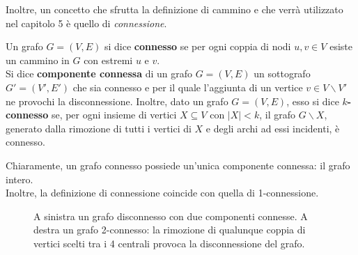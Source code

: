 \documentclass[a4paper,12pt,titlepage]{report}
\begin{document}
	Inoltre, un concetto che sfrutta la definizione di cammino e che verrà utilizzato nel capitolo 5 è quello di \emph{connessione}.
	\begin{dfn}
		Un grafo $G = (V, E)$ si dice {\bfseries connesso} se per ogni coppia di nodi $u, v \in V$ esiste un cammino in $G$ con estremi $u$ e $v$.
		\\Si dice {\bfseries componente connessa} di un grafo $G = (V, E)$ un sottografo $G' = (V', E')$ che sia connesso e per il quale l'aggiunta di un vertice $v \in V \smallsetminus V'$ ne provochi la disconnessione.
		Inoltre, dato un grafo $G = (V, E)$, esso si dice {\bfseries $k$-connesso} se, per ogni insieme di vertici $X \subseteq V$ con $\lvert X \rvert < k$, il grafo $G \smallsetminus X$, generato dalla rimozione di tutti i vertici di $X$ e degli archi ad essi incidenti, è connesso.
	\end{dfn}
	\noindent Chiaramente, un grafo connesso possiede un'unica componente connessa: il grafo intero.
	\\Inoltre, la definizione di connessione coincide con quella di 1-connessione.
	\begin{figure}[h]
		\centering
		\vspace{0.5cm}
		\caption{A sinistra un grafo disconnesso con due componenti connesse. A destra un grafo 2-connesso: la rimozione di qualunque coppia di vertici scelti tra i 4 centrali provoca la disconnessione del grafo.}
	\end{figure}
	
\end{document}
